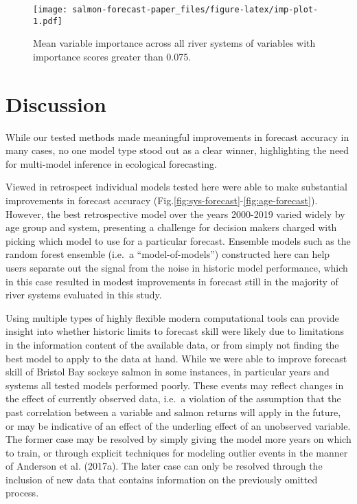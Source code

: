 \documentclass[
]{article}
\begin{document}
\begin{figure}
\centering
\texttt{[image: salmon-forecast-paper\_files/figure-latex/imp-plot-1.pdf]}
\caption{\label{fig:imp-plot}Mean variable importance across all river systems of variables with importance scores greater than 0.075.}
\end{figure}

\hypertarget{discussion}{%
\section*{Discussion}\label{discussion}}

While our tested methods made meaningful improvements in forecast accuracy in many cases, no one model type stood out as a clear winner, highlighting the need for multi-model inference in ecological forecasting.

Viewed in retrospect individual models tested here were able to make substantial improvements in forecast accuracy (Fig.\ref{fig:sys-forecast}-\ref{fig:age-forecast}). However, the best retrospective model over the years 2000-2019 varied widely by age group and system, presenting a challenge for decision makers charged with picking which model to use for a particular forecast. Ensemble models such as the random forest ensemble (i.e.~a ``model-of-models'') constructed here can help users separate out the signal from the noise in historic model performance, which in this case resulted in modest improvements in forecast still in the majority of river systems evaluated in this study.

Using multiple types of highly flexible modern computational tools can provide insight into whether historic limits to forecast skill were likely due to limitations in the information content of the available data, or from simply not finding the best model to apply to the data at hand. While we were able to improve forecast skill of Bristol Bay sockeye salmon in some instances, in particular years and systems all tested models performed poorly. These events may reflect changes in the effect of currently observed data, i.e.~a violation of the assumption that the past correlation between a variable and salmon returns will apply in the future, or may be indicative of an effect of the underling effect of an unobserved variable. The former case may be resolved by simply giving the model more years on which to train, or through explicit techniques for modeling outlier events in the manner of Anderson et al. (2017a). The later case can only be resolved through the inclusion of new data that contains information on the previously omitted process.
\end{document}
